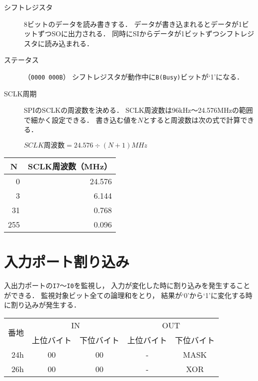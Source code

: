 \begin{description}
\item[シフトレジスタ]
  8ビットのデータを読み書きする．
  データが書き込まれるとデータが1ビットずつSOに出力される．
  同時にSIからデータが1ビットずつシフトレジスタに読み込まれる．
\item[ステータス]（\texttt{0000 000B}）
  シフトレジスタが動作中に\texttt{B(Busy)}ビットが`1'になる．
\item[SCLK周期]
  SPIのSCLKの周波数を決める．
  SCLK周波数は96kHz〜24.576MHzの範囲で細かく設定できる．
  書き込む値を$N$とすると周波数は次の式で計算できる．

  \centerline{$SCLK周波数 = 24.576 \div ( N + 1 ) MHz$}
\end{description}

\begin{center}
  \small\begin{tabular}{ r | r }\hline\hline
  \multicolumn{1}{c|}{N} & \multicolumn{1}{c}{SCLK周波数（MHz）} \\\hline
  0   & 24.576 \\
  3   &  6.144 \\
  31  &  0.768 \\
  255 &  0.096 \\
  \end{tabular}
\end{center}

\section{入力ポート割り込み}
入出力ポートの\texttt{I7}〜\texttt{I0}を監視し，
入力が変化した時に割り込みを発生することができる．
監視対象ビット全ての論理和をとり，
結果が`0'から`1'に変化する時に割り込みが発生する．

\begin{center}
  \small\begin{tabular}{| r | c | c || c | c |}\hline
    \multirow{2}{*}{番地}
    & \multicolumn{2}{c||}{IN}
    & \multicolumn{2}{c|}{OUT}
    \\\cline{2-5}
         & 上位バイト & 下位バイト & 上位バイト & 下位バイト
    \\\hline\hline
    24h  &  00 & 00
         &  -  & MASK \\\hline
    26h  &  00 & 00
         &  -  & XOR \\\hline
  \end{tabular}
\end{center}

